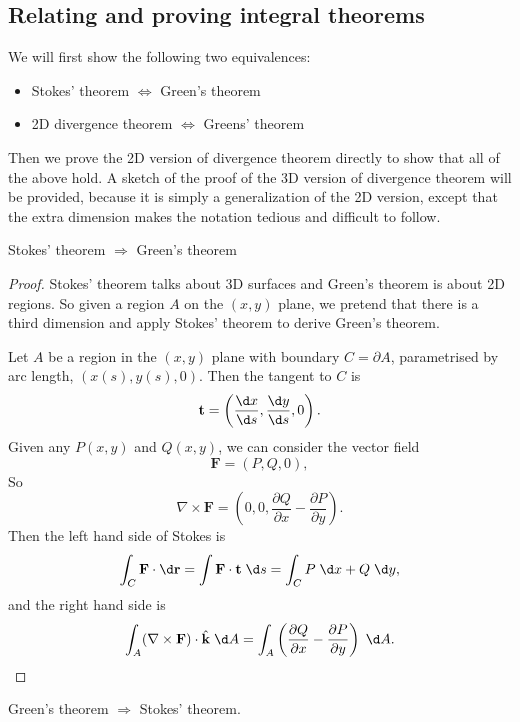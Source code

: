 \documentclass[a4paper]{article}
\begin{document}
\subsection{Relating and proving integral theorems}
We will first show the following two equivalences:
\begin{itemize}
  \item Stokes' theorem $\Leftrightarrow $ Green's theorem
  \item 2D divergence theorem $\Leftrightarrow$ Greens' theorem
\end{itemize}
Then we prove the 2D version of divergence theorem directly to show that all of the above hold. A sketch of the proof of the 3D version of divergence theorem will be provided, because it is simply a generalization of the 2D version, except that the extra dimension makes the notation tedious and difficult to follow.

\begin{prop}
  Stokes' theorem $\Rightarrow $ Green's theorem
\end{prop}

\begin{proof}
  Stokes' theorem talks about 3D surfaces and Green's theorem is about 2D regions. So given a region $A$ on the $(x, y)$ plane, we pretend that there is a third dimension and apply Stokes' theorem to derive Green's theorem.

  Let $A$ be a region in the $(x, y)$ plane with boundary $C = \partial A$, parametrised by arc length, $(x(s), y(s), 0)$. Then the tangent to $C$ is
  \[
    \mathbf{t} = \left(\frac{\d x}{\d s}, \frac{\d y}{\d s}, 0\right).
  \]
  Given any $P(x, y)$ and $Q(x, y)$,  we can consider the vector field
  \[
    \mathbf{F} = (P, Q, 0),
  \]
  So
  \[
    \nabla \times \mathbf{F} = \left(0, 0, \frac{\partial Q}{\partial x} - \frac{\partial P}{\partial y}\right).
  \]
  Then the left hand side of Stokes is 
  \[
    \int_C \mathbf{F} \cdot \d \mathbf{r} = \int \mathbf{F}\cdot \mathbf{t}\;\d s = \int_C P\;\d x + Q\;\d y,
  \]
  and the right hand side is
  \[
    \int_A (\nabla\times \mathbf{F})\cdot \hat{\mathbf{k}}\;\d A = \int_A \left(\frac{\partial Q}{\partial x} - \frac{\partial P}{\partial y}\right)\;\d A.
  \]
\end{proof}

\begin{prop}
  Green's theorem $\Rightarrow $ Stokes' theorem.
\end{prop}
\end{document}
